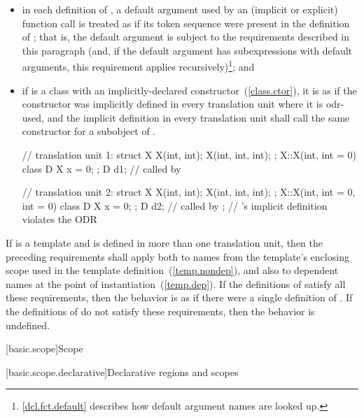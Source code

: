 \begin{itemize}
\item in each definition of , a default argument used by an
(implicit or explicit) function call is treated as if its token sequence
were present in the definition of ; that is, the default
argument is subject to the requirements described in this paragraph (and, if
the default argument has subexpressions with default arguments, this
requirement applies recursively)\footnote{\ref{dcl.fct.default}
describes how default argument names are looked up.}; and

\item if  is a class with an implicitly-declared
constructor~(\ref{class.ctor}), it is as if the constructor was
implicitly defined in every translation unit where it is odr-used, and the
implicit definition in every translation unit shall call the same
constructor for a subobject of .
\begin{example}

\begin{codeblock}
// translation unit 1:
struct X {
  X(int, int);
  X(int, int, int);
};
X::X(int, int = 0) { }
class D {
  X x = 0;
};
D d1;                           //  called by 

// translation unit 2:
struct X {
  X(int, int);
  X(int, int, int);
};
X::X(int, int = 0, int = 0) { }
class D {
  X x = 0;
};
D d2;                           //  called by ;
                                // 's implicit definition violates the ODR
\end{codeblock}
\end{example}
\end{itemize}
If  is a template and is defined in more than one
translation unit, then the preceding requirements
shall apply both to names from the template's enclosing scope used in the
template definition~(\ref{temp.nondep}), and also to dependent names at
the point of instantiation~(\ref{temp.dep}). If the definitions of
 satisfy all these requirements, then the behavior is
as if there were a single definition of . If the definitions of
 do not satisfy these requirements, then the behavior is
undefined.%

[basic.scope]{Scope}%

[basic.scope.declarative]{Declarative regions and scopes}%

